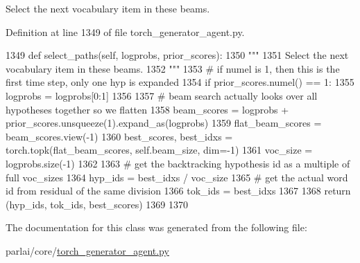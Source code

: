 \begin{DoxyVerb}Select the next vocabulary item in these beams.
\end{DoxyVerb}
 

Definition at line 1349 of file torch\+\_\+generator\+\_\+agent.\+py.


\begin{DoxyCode}
1349     \textcolor{keyword}{def }select\_paths(self, logprobs, prior\_scores):
1350         \textcolor{stringliteral}{"""}
1351 \textcolor{stringliteral}{        Select the next vocabulary item in these beams.}
1352 \textcolor{stringliteral}{        """}
1353         \textcolor{comment}{# if numel is 1, then this is the first time step, only one hyp is expanded}
1354         \textcolor{keywordflow}{if} prior\_scores.numel() == 1:
1355             logprobs = logprobs[0:1]
1356 
1357         \textcolor{comment}{# beam search actually looks over all hypotheses together so we flatten}
1358         beam\_scores = logprobs + prior\_scores.unsqueeze(1).expand\_as(logprobs)
1359         flat\_beam\_scores = beam\_scores.view(-1)
1360         best\_scores, best\_idxs = torch.topk(flat\_beam\_scores, self.beam\_size, dim=-1)
1361         voc\_size = logprobs.size(-1)
1362 
1363         \textcolor{comment}{# get the backtracking hypothesis id as a multiple of full voc\_sizes}
1364         hyp\_ids = best\_idxs / voc\_size
1365         \textcolor{comment}{# get the actual word id from residual of the same division}
1366         tok\_ids = best\_idxs %
1367 
1368         \textcolor{keywordflow}{return} (hyp\_ids, tok\_ids, best\_scores)
1369 
1370 
\end{DoxyCode}


The documentation for this class was generated from the following file\+:\begin{DoxyCompactItemize}
\item 
parlai/core/\hyperlink{torch__generator__agent_8py}{torch\+\_\+generator\+\_\+agent.\+py}\end{DoxyCompactItemize}
